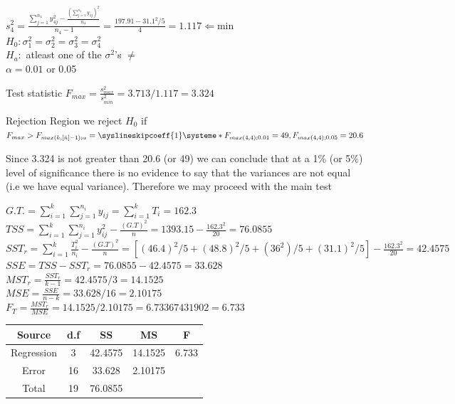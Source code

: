 \documentclass{article}
\begin{document}
\begin{enumerate}[1.]
$s_4^2 = \frac{
\sum_{j=1}^{n_4} {y_{4j}^2} - \frac{ (\sum_{j=1}^{n_4}{y_{4j}})^2}{n_4}
}{
n_4 - 1
}
=
\frac{
197.91 - 31.1^2 / 5
}{4}
= 1.117 \Leftarrow \text{min}
$ \\


$H_0: \sigma_1^2 = \sigma_2^2 = \sigma_3^2 = \sigma_4^2$ \\
$H_a:$ atleast one of the $\sigma^2$'s $\neq $\\
$ \alpha = 0.01$ or 0.05

Test statistic $F_{max} = \frac{s_{max}^2}{s_{min}^2} = 3.713 / 1.117 = 3.324$

Rejection Region we reject $H_0$ if $F_{max} > F_{max(k, [\bar{n}]-1); \alpha} =
\syslineskipcoeff{1}
\systeme*{F_{max(4, 4);0.01}=49,F_{max(4,4);0.05} = 20.6}
$

Since 3.324 is not greater than 20.6 (or 49) we can conclude that at a 1\% (or 5\%) level of significance there is no evidence to say that the variances are not equal (i.e we have equal variance). Therefore we may proceed with the main test

$G.T. = \sum_{i=1}^{k}{ \sum_{j=1}^{n_i}{y_{ij}}} = \sum_{i=1}^{k}{T_i} = 162.3$ \\
$TSS = \sum_{i=1}^{k}{ \sum_{j=1}^{n_i}{y_{ij}^2}} - \frac{(G.T)^2}{n} = 1393.15 - \frac{162.3^2}{20} = 76.0855$ \\
$SST_r = \sum_{i=1}^{k}{ \frac{T_i^2}{n_i}} - \frac{(G.T)^2}{n}  = [(46.4)^2/5 + (48.8)^2/5 + (36^2)/5 + (31.1)^2/5] - \frac{162.3^2}{20} = 42.4575$ \\
$SSE = TSS - SST_r = 76.0855 - 42.4575 = 33.628$\\
$MST_r = \frac{SST_r}{k - 1} = 42.4575 / 3 = 14.1525$ \\
$MSE = \frac{SSE}{n - k} = 33.628/16 = 2.10175$ \\
$F_T = \frac{MST_r}{MSE} = 14.1525/2.10175 = 6.73367431902 = 6.733$ \\


\begin{center}
 \begin{tabular}{||c c c c c||} 
 \hline
Source & d.f & SS & MS & F \\ [0.5ex] 
 \hline\hline
Regression & 3 & 42.4575 & 14.1525 & 6.733 \\
 \hline
Error & 16 & 33.628 & 2.10175 &  \\
 \hline
Total & 19  &  76.0855 & & \\ [1ex]
 \hline
\end{tabular}
\end{center}


\end{enumerate}
\end{document}
